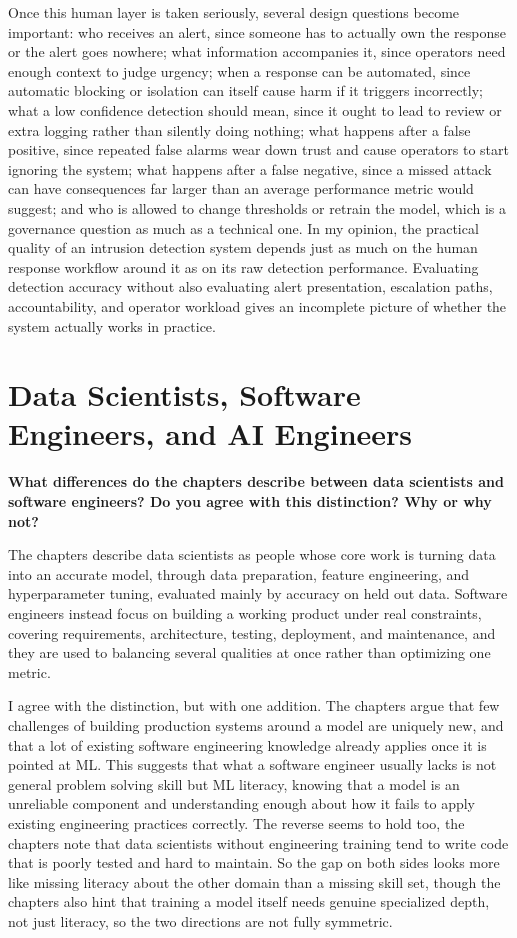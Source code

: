 \documentclass[11pt,a4paper]{article}
\begin{document}
Once this human layer is taken seriously, several design questions become important: who receives an alert, since someone has to actually own the response or the alert goes nowhere; what information accompanies it, since operators need enough context to judge urgency; when a response can be automated, since automatic blocking or isolation can itself cause harm if it triggers incorrectly; what a low confidence detection should mean, since it ought to lead to review or extra logging rather than silently doing nothing; what happens after a false positive, since repeated false alarms wear down trust and cause operators to start ignoring the system; what happens after a false negative, since a missed attack can have consequences far larger than an average performance metric would suggest; and who is allowed to change thresholds or retrain the model, which is a governance question as much as a technical one. In my opinion, the practical quality of an intrusion detection system depends just as much on the human response workflow around it as on its raw detection performance. Evaluating detection accuracy without also evaluating alert presentation, escalation paths, accountability, and operator workload gives an incomplete picture of whether the system actually works in practice.





\section{Data Scientists, Software Engineers, and AI Engineers}

\textbf{What differences do the chapters describe between data scientists and software engineers? Do you agree with this distinction? Why or why not?}

The chapters describe data scientists as people whose core work is turning data into an accurate model, through data preparation, feature engineering, and hyperparameter tuning, evaluated mainly by accuracy on held out data. Software engineers instead focus on building a working product under real constraints, covering requirements, architecture, testing, deployment, and maintenance, and they are used to balancing several qualities at once rather than optimizing one metric.

I agree with the distinction, but with one addition. The chapters argue that few challenges of building production systems around a model are uniquely new, and that a lot of existing software engineering knowledge already applies once it is pointed at ML. This suggests that what a software engineer usually lacks is not general problem solving skill but ML literacy, knowing that a model is an unreliable component and understanding enough about how it fails to apply existing engineering practices correctly. The reverse seems to hold too, the chapters note that data scientists without engineering training tend to write code that is poorly tested and hard to maintain. So the gap on both sides looks more like missing literacy about the other domain than a missing skill set, though the chapters also hint that training a model itself needs genuine specialized depth, not just literacy, so the two directions are not fully symmetric.
\end{document}
